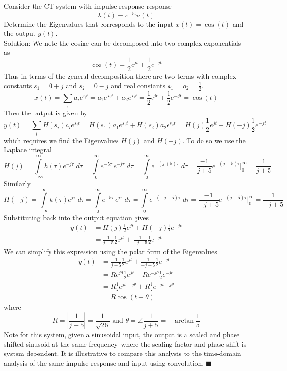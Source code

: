 \begin{example} Consider the CT system with impulse response response
  \[
  h(t) = e^{-5t}u(t)
  \]
  Determine the Eigenvalues that corresponds to the input $x(t) = \cos(t)$ and the output $y(t)$.\\

  Solution: We note the cosine can be decomposed into two complex exponentials as
  \[
  \cos(t) = \frac{1}{2}e^{jt} + \frac{1}{2}e^{-jt}
  \]
  Thus in terms of the general decomposition there are two terms with complex constants $s_1 = 0+j$ and $s_2 = 0-j$ and real constants $a_1 = a_2 = \frac{1}{2}$.
  \[
   x(t) = \sum_i a_i e^{s_it} = a_1 e^{s_1t} + a_2 e^{s_2t} = \frac{1}{2}e^{jt} + \frac{1}{2}e^{-jt} = \cos(t)
   \]
   Then the output is given by
   \[
   y(t) = \sum_i H(s_i) a_i e^{s_it} = H(s_1) a_1 e^{s_1t} + H(s_2) a_2 e^{s_2t} = H(j) \frac{1}{2}e^{jt} + H(-j)\frac{1}{2}e^{-jt}
   \]
   which requires we find the Eigenvalues $H(j)$ and $H(-j)$. To do so we use the Laplace integral
   \[
   H(j) = \int\limits_{-\infty}^{\infty}h(\tau)e^{-j\tau}\; d\tau = \int\limits_{0}^{\infty} e^{-5\tau} \, e^{-j\tau}\; d\tau = \int\limits_{0}^{\infty} e^{-(j+5)\tau}\; d\tau = \frac{-1}{j+5} e^{-(j+5)\tau} \Big|_{0}^{\infty} = \frac{1}{j+5}  
   \]
   Similarly
   \[
   H(-j) = \int\limits_{-\infty}^{\infty}h(\tau)e^{j\tau}\; d\tau = \int\limits_{0}^{\infty} e^{-5\tau} \, e^{j\tau}\; d\tau = \int\limits_{0}^{\infty} e^{-(-j+5)\tau}\; d\tau = \frac{-1}{-j+5} e^{-(j+5)\tau} \Big|_{0}^{\infty} = \frac{1}{-j+5}  
   \]
   Substituting back into the output equation gives
   \begin{align*}
     y(t) &= H(j) \frac{1}{2}e^{jt} + H(-j)\frac{1}{2}e^{-jt}\\
     &=  \frac{1}{j+5} \frac{1}{2}e^{jt} + \frac{1}{-j+5} \frac{1}{2}e^{-jt}
   \end{align*}
   We can simplify this expression using the polar form of the Eigenvalues
   \begin{align*}
     y(t) &= \frac{1}{j+5} \frac{1}{2}e^{jt} + \frac{1}{-j+5} \frac{1}{2}e^{-jt}\\
     &= Re^{j\theta} \frac{1}{2}e^{jt} + Re^{-j\theta} \frac{1}{2}e^{-jt}\\
     &= R \frac{1}{2}e^{jt + j\theta} + R \frac{1}{2}e^{-jt -j\theta}\\
     &= R\cos(t + \theta)
   \end{align*}
   where
   \[
   R = \left|\frac{1}{j+5}\right| = \frac{1}{\sqrt{26}} \mbox{ and } \theta = \angle{\frac{1}{j+5}} = -\arctan \frac{1}{5}
   \]
   Note for this system, given a sinusoidal input, the output is a scaled and phase shifted sinusoid at the same frequency, where the scaling factor and phase shift is system dependent. It is illustrative to compare this analysis to the time-domain analysis of the same impulse response and input using convolution.
   $\blacksquare$
\end{example}

